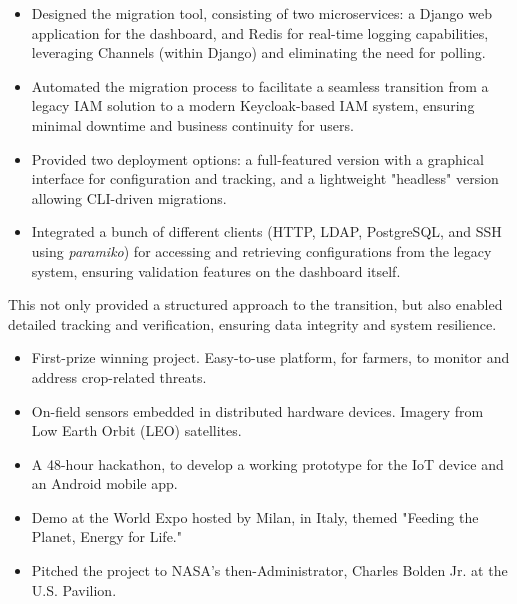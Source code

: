 	\begin{itemize}
		\item Designed the migration tool, consisting of two microservices: a Django web application for the dashboard, and Redis for real-time logging capabilities, leveraging Channels (within Django) and eliminating the need for polling.
		\item Automated the migration process to facilitate a seamless transition from a legacy IAM solution to a modern Keycloak-based IAM system, ensuring minimal downtime and business continuity for users.
		\item Provided two deployment options: a full-featured version with a graphical interface for configuration and tracking, and a lightweight "headless" version allowing CLI-driven migrations.
		\item Integrated a bunch of different clients (HTTP, LDAP, PostgreSQL, and SSH using \emph{paramiko}) for accessing and retrieving configurations from the legacy system, ensuring validation features on the dashboard itself.
	\end{itemize}
	\smallskip
	This not only provided a structured approach to the transition, but also enabled detailed tracking and verification, ensuring data integrity and system resilience.

	\divider

	\begin{itemize}
		\item First-prize winning project. Easy-to-use platform, for farmers, to monitor and address crop-related threats.
		\item On-field sensors embedded in distributed hardware devices. Imagery from Low Earth Orbit (LEO) satellites.
		\item A 48-hour hackathon, to develop a working prototype for the IoT device and an Android mobile app.
		\item Demo at the World Expo hosted by Milan, in Italy, themed "Feeding the Planet, Energy for Life."
		\item Pitched the project to NASA’s then-Administrator, Charles Bolden Jr. at the U.S. Pavilion.
	\end{itemize}

